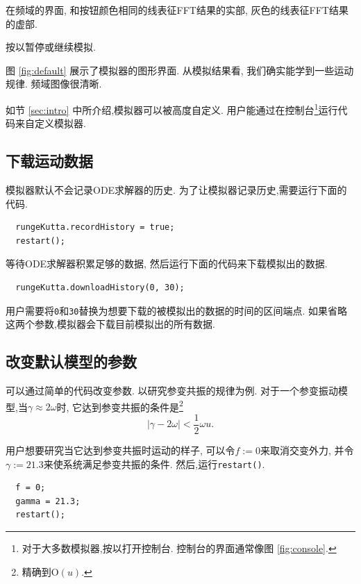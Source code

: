 \documentclass[12pt]{article}
\begin{document}
在频域的界面,
和按钮颜色相同的线表征FFT结果的实部,
灰色的线表征FFT结果的虚部.

按\LKeySpace 以暂停或继续模拟.

图 \ref{fig:default} 展示了模拟器的图形界面.
从模拟结果看,
我们确实能学到一些运动规律.
频域图像很清晰.

如节 \ref{sec:intro} 中所介绍,模拟器可以被高度自定义.
用户能通过在控制台\footnote{
  对于大多数模拟器,按以打开控制台.
  控制台的界面通常像图 \ref{fig:console}.
}运行代码来自定义模拟器.

\subsection{下载运动数据}

模拟器默认不会记录ODE求解器的历史.
为了让模拟器记录历史,需要运行下面的代码.

\begin{verbatim}
  rungeKutta.recordHistory = true;
  restart();
\end{verbatim}

等待ODE求解器积累足够的数据,
然后运行下面的代码来下载模拟出的数据.

\begin{verbatim}
  rungeKutta.downloadHistory(0, 30);
\end{verbatim}

用户需要将\texttt{0}和\texttt{30}替换为想要下载的被模拟出的数据的时间的区间端点.
如果省略这两个参数,模拟器会下载目前模拟出的所有数据.

\subsection{改变默认模型的参数}

可以通过简单的代码改变参数.
以研究参变共振的规律为例.
对于一个参变振动模型,当$\gamma\approx2\omega$时,
它达到参变共振的条件是\footnote{
  精确到$\mathrm O\left(u\right)$.
} \cite[p. 82]{landau1976mechanics}
\begin{equation}
  \left|\gamma-2\omega\right|<\frac12\omega u.
\end{equation}

用户想要研究当它达到参变共振时运动的样子,
可以令$f:=0$来取消交变外力,
并令$\gamma:=21.3$来使系统满足参变共振的条件.
然后,运行\texttt{restart()}.

\begin{verbatim}
  f = 0;
  gamma = 21.3;
  restart();
\end{verbatim}
\end{document}

